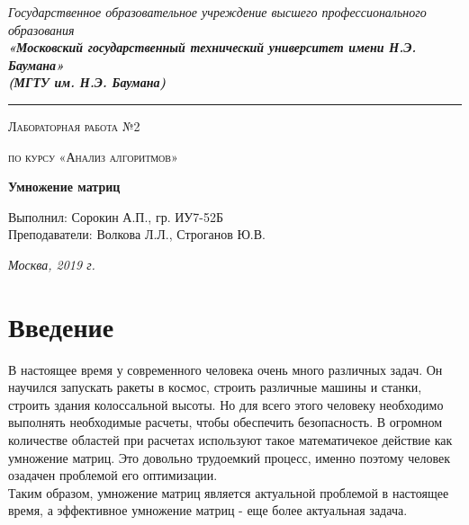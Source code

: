 \documentclass[12pt, a4paper]{report}
\begin{document}
    \begin{titlepage}

        \begin{center}
            \Large
            {\sl Государственное образовательное учреждение высшего профессионального образования\\
            {\bf«Московский государственный технический университет имени Н.Э. Баумана»\\
				(МГТУ им. Н.Э. Баумана)}}
				\noindent\rule{\textwidth}{2pt}
            \vspace{3cm}

			{\scshape\LARGE Лабораторная работа №2 \par}
			\vspace{0.5cm}	
			{\scshape\LARGE по курсу «Анализ алгоритмов» \par}
			\vspace{1.5cm}
			{\huge\bfseries Умножение матриц \par}
			\vspace{2cm}
			\Large Выполнил: Сорокин А.П., гр. ИУ7-52Б\\
			\vspace{0.5cm}
			{\Large Преподаватели: Волкова Л.Л., Строганов Ю.В.}
		
			\vfill
			\Large \textit {Москва, 2019 г.}
            
        \end{center}

    \end{titlepage}
	
	\tableofcontents

	\chapter*{Введение}
	
	\hspace{1cm}В настоящее время у современного человека очень много различных задач. Он научился запускать ракеты в космос, строить различные машины и станки, строить здания колоссальной высоты. Но для всего этого человеку необходимо выполнять необходимые расчеты, чтобы обеспечить безопасность. В огромном количестве областей при расчетах используют такое математичекое действие как умножение матриц. Это довольно трудоемкий процесс, именно поэтому человек озадачен проблемой его оптимизации.\\
	Таким образом, умножение матриц является актуальной проблемой в настоящее время, а эффективное умножение матриц - еще более актуальная задача.
\end{document}
